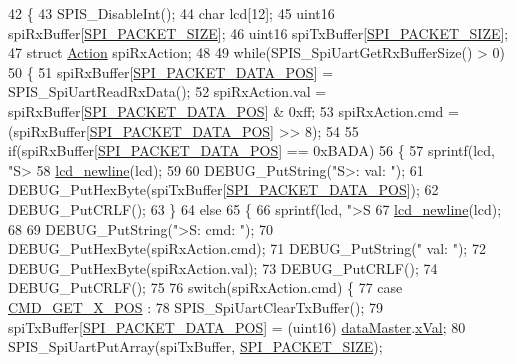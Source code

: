 \begin{DoxyCode}
42 \{
43   SPIS\_DisableInt();
44   \textcolor{keywordtype}{char} lcd[12];
45   uint16 spiRxBuffer[\hyperlink{spi_8h_aea54fc09a960e5a1b7096374f3eebee4}{SPI\_PACKET\_SIZE}];
46   uint16 spiTxBuffer[\hyperlink{spi_8h_aea54fc09a960e5a1b7096374f3eebee4}{SPI\_PACKET\_SIZE}];
47   \textcolor{keyword}{struct }\hyperlink{queue_8h_df/d8c/struct_action}{Action} spiRxAction;
48   
49   \textcolor{keywordflow}{while}(SPIS\_SpiUartGetRxBufferSize() > 0)
50   \{
51     spiRxBuffer[\hyperlink{spi_8h_a5ffe58623f478b7b960a1349530a6655}{SPI\_PACKET\_DATA\_POS}] = SPIS\_SpiUartReadRxData();
52     spiRxAction.val = spiRxBuffer[\hyperlink{spi_8h_a5ffe58623f478b7b960a1349530a6655}{SPI\_PACKET\_DATA\_POS}] & 0xff;
53     spiRxAction.cmd = (spiRxBuffer[\hyperlink{spi_8h_a5ffe58623f478b7b960a1349530a6655}{SPI\_PACKET\_DATA\_POS}] >> 8);
54     
55     \textcolor{keywordflow}{if}(spiRxBuffer[\hyperlink{spi_8h_a5ffe58623f478b7b960a1349530a6655}{SPI\_PACKET\_DATA\_POS}] == 0xBADA)
56     \{
57       sprintf(lcd, \textcolor{stringliteral}{"S> %
58       \hyperlink{lcd_8h_a507dd352aee8161dc556e3d1439a2be2}{lcd\_newline}(lcd);
59       
60       DEBUG\_PutString(\textcolor{stringliteral}{"S>: val: "});
61       DEBUG\_PutHexByte(spiTxBuffer[\hyperlink{spi_8h_a5ffe58623f478b7b960a1349530a6655}{SPI\_PACKET\_DATA\_POS}]);
62       DEBUG\_PutCRLF();
63     \}
64     \textcolor{keywordflow}{else}
65     \{
66       sprintf(lcd, \textcolor{stringliteral}{">S %
67       \hyperlink{lcd_8h_a507dd352aee8161dc556e3d1439a2be2}{lcd\_newline}(lcd);
68       
69       DEBUG\_PutString(\textcolor{stringliteral}{">S: cmd: "});
70       DEBUG\_PutHexByte(spiRxAction.cmd);
71       DEBUG\_PutString(\textcolor{stringliteral}{" val: "});
72       DEBUG\_PutHexByte(spiRxAction.val);
73       DEBUG\_PutCRLF();
74       DEBUG\_PutCRLF();
75       
76       \textcolor{keywordflow}{switch}(spiRxAction.cmd) \{
77         \textcolor{keywordflow}{case} \hyperlink{handler_8h_aa50e083669624eeaef782ebc867008f9}{CMD\_GET\_X\_POS} :
78           SPIS\_SpiUartClearTxBuffer();
79           spiTxBuffer[\hyperlink{spi_8h_a5ffe58623f478b7b960a1349530a6655}{SPI\_PACKET\_DATA\_POS}] = (uint16)
      \hyperlink{data_8h_a6b1a8871e30b304a6f5764c44d89e489}{dataMaster}.\hyperlink{data_8h_a7849f509240fa25127fcda8c5009f02b}{xVal};
80           SPIS\_SpiUartPutArray(spiTxBuffer, \hyperlink{spi_8h_aea54fc09a960e5a1b7096374f3eebee4}{SPI\_PACKET\_SIZE});
}}
\end{DoxyCode}
